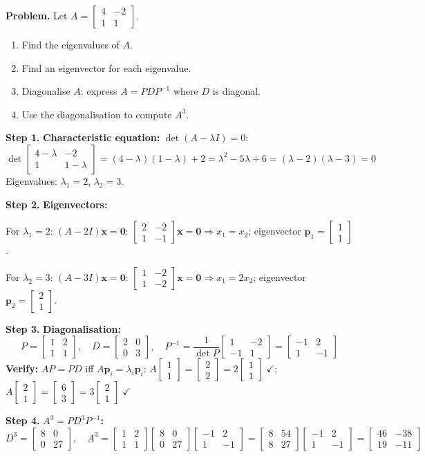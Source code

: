 \documentclass[12pt,a4paper]{article}
\newcommand{\step}[1]{\noindent\textbf{Step #1.}\;}
\newcommand{\mat}[1]{\begin{bmatrix}#1\end{bmatrix}}
\begin{document}
	\begin{tcolorbox}[worked]
		\textbf{Problem.} Let $A=\mat{4&-2\\1&1}$.
		
		\begin{enumerate}[label=(\alph*), nosep]
			\item Find the eigenvalues of $A$.
			\item Find an eigenvector for each eigenvalue.
			\item Diagonalise $A$: express $A = PDP^{-1}$ where $D$ is diagonal.
			\item Use the diagonalisation to compute $A^3$.
		\end{enumerate}
		
		\step{1} \textbf{Characteristic equation:} $\det(A-\lambda I)=0$:
		\[
		\det\mat{4-\lambda&-2\\1&1-\lambda}=(4-\lambda)(1-\lambda)+2=\lambda^2-5\lambda+6=(\lambda-2)(\lambda-3)=0
		\]
		Eigenvalues: $\lambda_1=2$, $\lambda_2=3$.
		
		\step{2} \textbf{Eigenvectors:}
		
		For $\lambda_1=2$: $(A-2I)\mathbf{x}=\mathbf{0}$:
		$\mat{2&-2\\1&-1}\mathbf{x}=\mathbf{0}\Rightarrow x_1=x_2$; eigenvector $\mathbf{p}_1=\mat{1\\1}$.
		
		For $\lambda_2=3$: $(A-3I)\mathbf{x}=\mathbf{0}$:
		$\mat{1&-2\\1&-2}\mathbf{x}=\mathbf{0}\Rightarrow x_1=2x_2$; eigenvector $\mathbf{p}_2=\mat{2\\1}$.
		
		\step{3} \textbf{Diagonalisation:}
		\[
		P=\mat{1&2\\1&1},\quad D=\mat{2&0\\0&3},\quad P^{-1}=\frac{1}{\det P}\mat{1&-2\\-1&1}=\mat{-1&2\\1&-1}
		\]
		\textbf{Verify:} $AP = PD$ iff $A\mathbf{p}_i=\lambda_i\mathbf{p}_i$:
		$A\mat{1\\1}=\mat{2\\2}=2\mat{1\\1}\;\checkmark$;\;
		$A\mat{2\\1}=\mat{6\\3}=3\mat{2\\1}\;\checkmark$
		
		\step{4} \textbf{$A^3 = PD^3P^{-1}$:}
		\[
		D^3=\mat{8&0\\0&27},\quad
		A^3=\mat{1&2\\1&1}\mat{8&0\\0&27}\mat{-1&2\\1&-1}
		=\mat{8&54\\8&27}\mat{-1&2\\1&-1}
		=\mat{46&-38\\19&-11}
		\]
	\end{tcolorbox}
	
\end{document}
